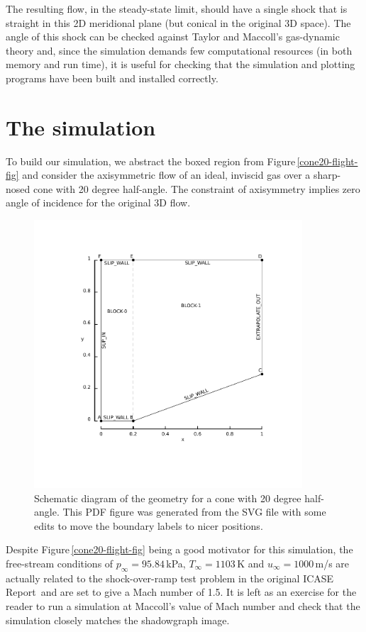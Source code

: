 \medskip
The resulting flow, in the steady-state limit, should have a single shock that is 
straight in this 2D meridional plane (but conical in the original 3D space).
The angle of this shock can be checked against Taylor and Maccoll's gas-dynamic theory and,
since the simulation demands few computational resources (in both memory and run time), 
it is useful for checking that the simulation and
plotting programs have been built and installed correctly.

\section{The simulation}
%
To build our simulation, we abstract the boxed region from Figure\,\ref{cone20-flight-fig}
and consider the axisymmetric flow of an ideal, inviscid gas over a sharp-nosed cone 
with 20 degree half-angle.
The constraint of axisymmetry implies zero angle of incidence for the original 3D flow.

\begin{figure}[htbp]
\begin{center}
\includegraphics[width=10cm, viewport=76 78 389 398]{../2D/cone20-simple/cone20_svg.pdf}
\end{center}
\caption{Schematic diagram of the geometry for a cone 
         with 20 degree half-angle.
	 This PDF figure was generated from the SVG file with some edits 
	 to move the boundary labels to nicer positions.}
\label{cone20-geometry-fig}
\end{figure}

\medskip
Despite Figure\,\ref{cone20-flight-fig} being a good motivator for this simulation,
the free-stream conditions of $p_{\infty} = 95.84$\,kPa, $T_{\infty} = 1103$\,K
and $u_{\infty} = 1000$\,m/s are actually related to the shock-over-ramp test problem
in the original ICASE Report\,\cite{jacobs_91d} and are set to give a Mach number of 1.5.
It is left as an exercise for the reader to run a simulation at Maccoll's value of
Mach number and check that the simulation closely matches the shadowgraph image.


